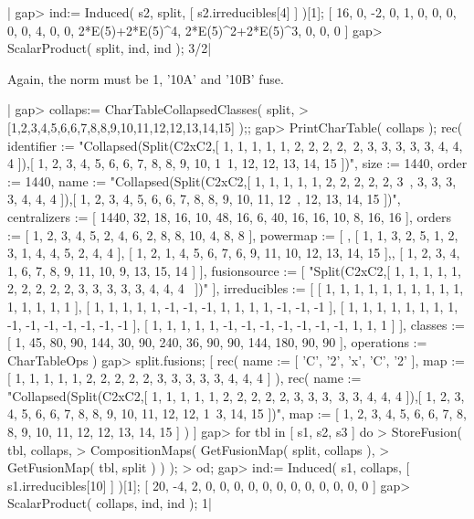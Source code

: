 |    gap> ind:= Induced( s2, split, [ s2.irreducibles[4] ] )[1];
    [ 16, 0, -2, 0, 1, 0, 0, 0, 0, 0, 4, 0, 0, 2*E(5)+2*E(5)^4,
      2*E(5)^2+2*E(5)^3, 0, 0, 0 ]
    gap> ScalarProduct( split, ind, ind );
    3/2|

Again, the norm must be 1, '10A' and '10B' fuse.

|    gap> collaps:= CharTableCollapsedClasses( split,
    >                    [1,2,3,4,5,6,6,7,8,8,9,10,11,12,12,13,14,15] );;
    gap> PrintCharTable( collaps );
    rec( identifier := "Collapsed(Split(C2xC2,[ 1, 1, 1, 1, 1, 2, 2, 2, 2,\
     2, 3, 3, 3, 3, 3, 4, 4, 4 ]),[ 1, 2, 3, 4, 5, 6, 6, 7, 8, 8, 9, 10, 1\
    1, 12, 12, 13, 14, 15 ])", size := 1440, order :=
    1440, name := "Collapsed(Split(C2xC2,[ 1, 1, 1, 1, 1, 2, 2, 2, 2, 2, 3\
    , 3, 3, 3, 3, 4, 4, 4 ]),[ 1, 2, 3, 4, 5, 6, 6, 7, 8, 8, 9, 10, 11, 12\
    , 12, 13, 14, 15 ])", centralizers := [ 1440, 32, 18, 16, 10, 48, 16,
      6, 40, 16, 16, 10, 8, 16, 16 ], orders :=
    [ 1, 2, 3, 4, 5, 2, 4, 6, 2, 8, 8, 10, 4, 8, 8 ], powermap :=
    [ , [ 1, 1, 3, 2, 5, 1, 2, 3, 1, 4, 4, 5, 2, 4, 4 ],
      [ 1, 2, 1, 4, 5, 6, 7, 6, 9, 11, 10, 12, 13, 14, 15 ],,
      [ 1, 2, 3, 4, 1, 6, 7, 8, 9, 11, 10, 9, 13, 15, 14 ]
     ], fusionsource :=
    [ "Split(C2xC2,[ 1, 1, 1, 1, 1, 2, 2, 2, 2, 2, 3, 3, 3, 3, 3, 4, 4, 4 \
    ])" ], irreducibles :=
    [ [ 1, 1, 1, 1, 1, 1, 1, 1, 1, 1, 1, 1, 1, 1, 1 ],
      [ 1, 1, 1, 1, 1, -1, -1, -1, 1, 1, 1, 1, -1, -1, -1 ],
      [ 1, 1, 1, 1, 1, 1, 1, 1, -1, -1, -1, -1, -1, -1, -1 ],
      [ 1, 1, 1, 1, 1, -1, -1, -1, -1, -1, -1, -1, 1, 1, 1 ]
     ], classes := [ 1, 45, 80, 90, 144, 30, 90, 240, 36, 90, 90, 144,
      180, 90, 90 ], operations := CharTableOps )
    gap> split.fusions;
    [ rec(
          name := [ 'C', '2', 'x', 'C', '2' ],
          map := [ 1, 1, 1, 1, 1, 2, 2, 2, 2, 2, 3, 3, 3, 3, 3, 4, 4, 4 ]
         ), rec(
          name :=
           "Collapsed(Split(C2xC2,[ 1, 1, 1, 1, 1, 2, 2, 2, 2, 2, 3, 3, 3,\
     3, 3, 4, 4, 4 ]),[ 1, 2, 3, 4, 5, 6, 6, 7, 8, 8, 9, 10, 11, 12, 12, 1\
    3, 14, 15 ])",
          map := [ 1, 2, 3, 4, 5, 6, 6, 7, 8, 8, 9, 10, 11, 12, 12, 13,
              14, 15 ] ) ]
    gap> for tbl in [ s1, s2, s3 ] do
    >      StoreFusion( tbl, collaps,
    >                   CompositionMaps( GetFusionMap( split, collaps ),
    >                                    GetFusionMap( tbl, split ) ) );
    >    od;
    gap> ind:= Induced( s1, collaps, [ s1.irreducibles[10] ] )[1];
    [ 20, -4, 2, 0, 0, 0, 0, 0, 0, 0, 0, 0, 0, 0, 0 ]
    gap> ScalarProduct( collaps, ind, ind );
    1|

